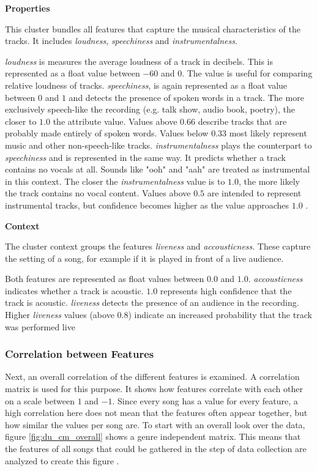 \textbf{Properties}

This cluster bundles all features that capture the musical characteristics of the tracks.
It includes \emph{loudness}, \emph{speechiness} and \emph{instrumentalness}.

\emph{loudness} is measures the average loudness of a track in decibels. This is represented as a float value between \(-60\) and \(0\).
The value is useful for comparing relative loudness of tracks. 
\emph{speechiness}, is again represented as a float value between \(0\) and \(1\) and detects the presence of spoken words in a track. 
The more exclusively speech-like the recording (e.g. talk show, audio book, poetry),
the closer to \(1.0\) the attribute value. 
Values above \(0.66\) describe tracks that are probably made entirely of spoken words.
Values below \(0.33\) most likely represent music and other non-speech-like tracks. 
\emph{instrumentalness} plays the counterpart to \emph{speechiness} and is represented in the same way.
It predicts whether a track contains no vocals at all. Sounds like "ooh" and "aah" are treated as instrumental in this context.
The closer the \emph{instrumentalness} value is to \(1.0\), the more likely the track contains no vocal content. 
Values above \(0.5\) are intended to represent instrumental tracks, but confidence becomes higher as the value approaches \(1.0\) \cite[]{Features}.

\textbf{Context}

The cluster context groups the features \emph{liveness} and \emph{accousticness}.
These capture the setting of a song, for example if it is played in front of a live audience.

Both features are represented as float values between \(0.0\) and \(1.0\).
\emph{accousticness} indicates whether a track is acoustic. \(1.0\) represents high confidence that the track is acoustic. 
\emph{liveness} detects the presence of an audience in the recording. 
Higher \emph{liveness} values (above $0.8$) indicate an increased probability that the track was performed live \cite{Features}

\subsubsection{Correlation between Features}
\label{sec:correlation between features}

Next, an overall correlation of the different features is examined.
A correlation matrix is used for this purpose. It shows how
features correlate with each other on a scale between \(1\) and \(-1\).
Since every song has a value for every feature, a high correlation here does not mean that the features often appear together,
but how similar the values per song are. To start with an overall look over the data,
figure \ref{fig:du_cm_overall}  shows a genre independent matrix.
This means that the features of all songs that could be gathered in the step of data
collection are analyzed to create this figure \cite{Features}.

